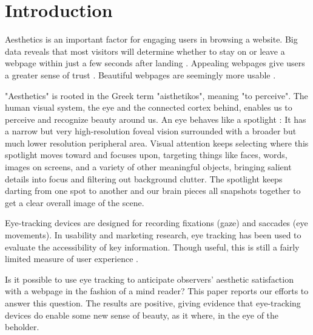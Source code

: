 
\section{Introduction}
\label{sec:intro}
Aesthetics is an important factor for engaging users in browsing a website.
Big data reveals that most visitors will determine whether to stay on or leave a webpage within just a few seconds after landing \citep{Liu2010}.
Appealing webpages give users a greater sense of trust
\citep{Casal2008The, Li2010Increasing, Lindgaard2011}.
Beautiful webpages are seemingly more usable \citep{Tractinsky2000}.

"Aesthetics" is rooted in the Greek term "aisthetikos", meaning "to perceive".
The human visual system, the eye and the connected cortex behind, enables us to perceive and recognize beauty around us.
An eye behaves like a spotlight \citep{Eriksen1972}: It has a narrow but very high-resolution foveal vision surrounded with a broader but much lower resolution peripheral area.
Visual attention keeps selecting where this spotlight moves toward and focuses upon, targeting things like faces, words, images on screens, and a variety of other meaningful objects, bringing salient details into focus and filtering out background clutter.
The spotlight keeps darting from one spot to another and our brain pieces all snapshots together to get a clear overall image of the scene.

Eye-tracking devices are designed for recording fixations (gaze) and saccades (eye movements).
In usability and marketing research, eye tracking has been used to evaluate the accessibility of key information.
Though useful, this is still a fairly limited measure of user experience \citep{Santella}.

Is it possible to use eye tracking to anticipate observers' aesthetic satisfaction with a webpage in the fashion of a mind reader?
This paper reports our efforts to answer this question.
The results are positive, giving evidence that eye-tracking devices do enable some new sense of beauty, as it where, in the eye of the beholder.


